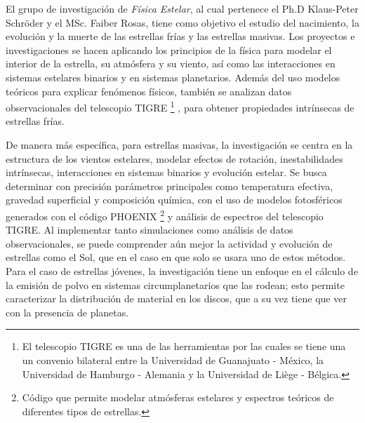 \documentclass[11pt]{article}
\begin{document}
El grupo de investigación de \textit{Física Estelar}, al cual pertenece el Ph.D Klaus-Peter Schröder y el MSc. Faiber Rosas, tiene como objetivo el estudio del nacimiento, la evolución y la muerte de las estrellas frías y las estrellas masivas.  Los proyectos e investigaciones se hacen aplicando los principios de la física para modelar el interior de la estrella, su atmósfera y su viento, así como las interacciones en sistemas estelares binarios y en sistemas planetarios. Además del uso modelos teóricos para explicar fenómenos físicos, también se analizan datos observacionales del telescopio TIGRE  \footnote{El telescopio TIGRE es una de las herramientas por las cuales se tiene una un convenio bilateral entre la Universidad de Guanajuato - México, la Universidad de Hamburgo - Alemania y la Universidad de Liège - Bélgica.} \cite{schmitt2014tigre}, para obtener propiedades intrínsecas de estrellas frías.

\noindent De manera más específica, para estrellas masivas, la investigación se centra en la estructura de los vientos estelares, modelar efectos de rotación,  inestabilidades intrínsecas, interacciones en sistemas binarios y evolución estelar. Se busca determinar con precisión parámetros principales como temperatura efectiva, gravedad superficial y composición química, con el uso de modelos fotosféricos generados con el código PHOENIX  \footnote{Código que permite modelar atmósferas estelares y espectros teóricos de diferentes tipos de estrellas.} \cite{hauschildt2005cool} y análisis de espectros del telescopio TIGRE. Al implementar tanto simulaciones como análisis de datos observacionales, se puede comprender aún mejor la actividad y evolución de estrellas como el Sol, que en el caso en que solo se usara uno de estos métodos. Para el caso de estrellas jóvenes, la investigación tiene un enfoque en el cálculo de la emisión de polvo en sistemas circumplanetarios que las rodean; esto permite caracterizar la distribución de material en los discos, que a su vez tiene que ver con la presencia de planetas. 
\end{document}
